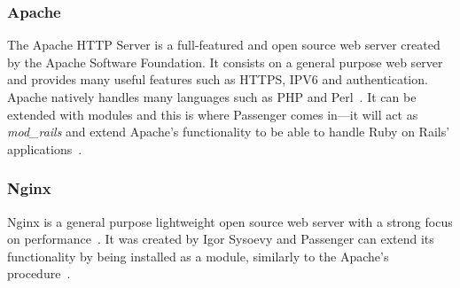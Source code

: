 \subsubsection{Apache}
The Apache HTTP Server is a full-featured and open source web server created by the Apache Software Foundation. It consists on a general purpose web server and provides many useful features such as HTTPS, IPV6 and authentication. Apache natively handles many languages such as PHP and Perl~\cite{apache_features}. It can be extended with modules and this is where Passenger comes in---it will act as \textit{mod\_rails} and extend Apache's functionality to be able to handle Ruby on Rails' applications~\cite{passenger_whatis}.


\subsubsection{Nginx}
Nginx is a general purpose lightweight open source web server with a strong focus on performance~\cite{nginx_features}. It was created by Igor Sysoevy and Passenger can extend its functionality by being installed as a module, similarly to the Apache's procedure~\cite{passenger_whatis}.
